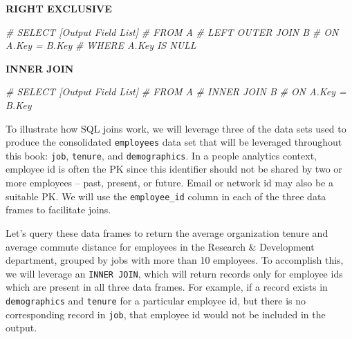 \documentclass[
]{book}
\newenvironment{Shaded}{\begin{snugshade}}{\end{snugshade}}
\newcommand{\CommentTok}[1]{\textcolor[rgb]{0.56,0.35,0.01}{\textit{#1}}}
\begin{document}
\textbf{RIGHT EXCLUSIVE}

\begin{Shaded}
\begin{Highlighting}[]
\CommentTok{\#  SELECT [Output Field List]}
\CommentTok{\#  FROM A }
\CommentTok{\#  LEFT OUTER JOIN B}
\CommentTok{\#  ON A.Key = B.Key}
\CommentTok{\#  WHERE A.Key IS NULL}
\end{Highlighting}
\end{Shaded}

\textbf{INNER JOIN}

\begin{Shaded}
\begin{Highlighting}[]
\CommentTok{\#  SELECT [Output Field List]}
\CommentTok{\#  FROM A }
\CommentTok{\#  INNER JOIN B}
\CommentTok{\#  ON A.Key = B.Key}
\end{Highlighting}
\end{Shaded}

To illustrate how SQL joins work, we will leverage three of the data sets used to produce the consolidated \texttt{employees} data set that will be leveraged throughout this book: \texttt{job}, \texttt{tenure}, and \texttt{demographics}. In a people analytics context, employee id is often the PK since this identifier should not be shared by two or more employees -- past, present, or future. Email or network id may also be a suitable PK. We will use the \texttt{employee\_id} column in each of the three data frames to facilitate joins.

Let's query these data frames to return the average organization tenure and average commute distance for employees in the Research \& Development department, grouped by jobs with more than 10 employees. To accomplish this, we will leverage an \texttt{INNER\ JOIN}, which will return records only for employee ids which are present in all three data frames. For example, if a record exists in \texttt{demographics} and \texttt{tenure} for a particular employee id, but there is no corresponding record in \texttt{job}, that employee id would not be included in the output.
\end{document}
